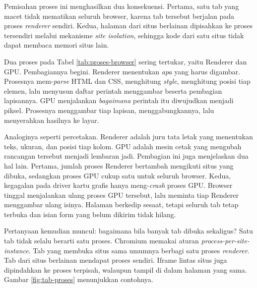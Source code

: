 Pemisahan proses ini menghasilkan dua konsekuensi. Pertama, satu tab
yang macet tidak mematikan seluruh browser, karena tab tersebut berjalan pada
proses \textit{renderer} sendiri. Kedua, halaman dari situs berlainan
dipisahkan ke proses tersendiri melalui mekanisme \textit{site isolation},
sehingga kode dari satu situs tidak dapat membaca memori situs lain.

Dua proses pada Tabel \ref{tab:proses-browser} sering tertukar, yaitu Renderer
dan GPU. Pembagiannya begini. Renderer menentukan \emph{apa} yang harus
digambar. Prosesnya mem-\textit{parse} HTML dan CSS, menghitung
\textit{style}, menghitung posisi tiap elemen, lalu menyusun daftar perintah
menggambar beserta pembagian lapisannya. GPU menjalankan \emph{bagaimana}
perintah itu diwujudkan menjadi piksel. Prosesnya menggambar tiap lapisan,
menggabungkannya, lalu menyerahkan hasilnya ke layar.

Analoginya seperti percetakan. Renderer adalah juru tata letak yang menentukan
teks, ukuran, dan posisi tiap kolom. GPU adalah mesin cetak yang mengubah
rancangan tersebut menjadi lembaran jadi. Pembagian ini juga menjelaskan dua hal
lain. Pertama, jumlah proses Renderer bertambah mengikuti situs yang dibuka,
sedangkan proses GPU cukup satu untuk seluruh browser. Kedua, kegagalan pada
driver kartu grafis hanya meng-\textit{crash} proses GPU. Browser tinggal menjalankan
ulang proses GPU tersebut, lalu meminta tiap Renderer menggambar ulang isinya.
Halaman berkedip sesaat, tetapi seluruh tab tetap terbuka dan isian form yang
belum dikirim tidak hilang.

Pertanyaan kemudian muncul: bagaimana bila banyak tab dibuka sekaligus? Satu
tab tidak selalu berarti satu proses. Chromium memakai aturan
\textit{process-per-site-instance}. Tab yang membuka situs sama umumnya berbagi
satu proses \textit{renderer}. Tab dari situs berlainan mendapat proses sendiri.
Iframe lintas situs juga dipindahkan ke proses terpisah, walaupun tampil di
dalam halaman yang sama. Gambar \ref{fig:tab-proses} menunjukkan contohnya.

